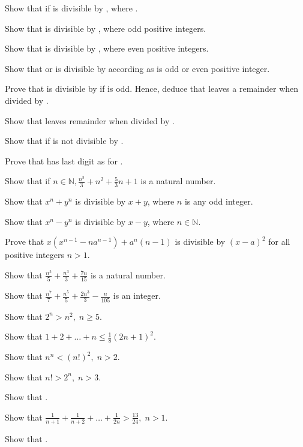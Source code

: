 \item Show that if  is divisible by , where .
\item Show that  is divisible by , where  odd positive integers.
\item Show that  is divisible by , where  even positive integers.
\item Show that  or  is divisible by  according as  is odd or even
  positive integer.
\item Prove that  is divisible by  if  is odd. Hence, deduce that  leaves
  a remainder  when divided by .
\item Show that  leaves remainder  when divided by .
\item Show that if  is not divisible by .
\item Prove that  has last digit as  for .
\item Show that if $n\in\mathbb{N}, \frac{n^3}{3} + n^2 + \frac{5}{3}n + 1$ is a natural number.
\item Show that $x^n + y^n$ is divisible by $x + y$, where $n$ is any odd integer.
\item Show that $x^n - y^n$ is divisible by $x - y$, where $n\in\mathbb{N}$.
\item Prove that $x(x^{n - 1} - na^{n - 1}) + a^n(n - 1)$ is divisible by $(x - a)^2$ for all positive integers $n > 1$.
\item Show that $\frac{n^5}{5} + \frac{n^3}{3} + \frac{7n}{15}$ is a natural number.
\item Show that $\frac{n^7}{7} + \frac{n^5}{5} + \frac{2n^3}{3} - \frac{n}{105}$ is an integer.
\item Show that $2^n > n^2,\;n\geq 5$.
\item Show that $1 + 2 + \ldots + n\leq \frac{1}{8}(2n + 1)^2$.
\item Show that $n^n < (n!)^2,\;n>2$.
\item Show that $n! > 2^n,\;n>3$.
\item Show that .
\item Show that $\frac{1}{n + 1} + \frac{1}{n + 2} + \ldots + \frac{1}{2n} > \frac{13}{24},\;n>1$.
\item Show that .

